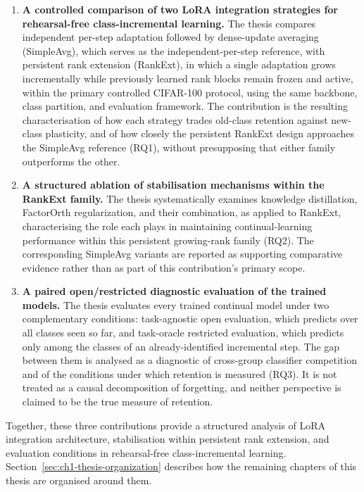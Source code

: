 \begin{enumerate}
\item \textbf{A controlled comparison of two LoRA integration strategies
   for rehearsal-free class-incremental learning.} The thesis compares
   independent per-step adaptation followed by dense-update averaging
   (SimpleAvg), which serves as the independent-per-step reference, with
   persistent rank extension (RankExt), in which a single adaptation grows
   incrementally while previously learned rank blocks remain frozen and
   active, within the primary controlled CIFAR-100 protocol, using the same backbone, class
   partition, and evaluation framework. The contribution is the resulting
   characterisation of how each strategy trades old-class retention against
   new-class plasticity, and of how closely the persistent RankExt design
   approaches the SimpleAvg reference (RQ1), without presupposing that
   either family outperforms the other.

\item \textbf{A structured ablation of stabilisation mechanisms within the
   RankExt family.} The thesis systematically examines knowledge
   distillation, FactorOrth regularization, and their combination, as
   applied to RankExt, characterising the role each plays in maintaining
   continual-learning performance within this persistent growing-rank
   family (RQ2). The corresponding SimpleAvg variants are reported as
   supporting comparative evidence rather than as part of this
   contribution's primary scope.

\item \textbf{A paired open/restricted diagnostic evaluation of the
   trained models.} The thesis evaluates every trained continual model
   under two complementary conditions: task-agnostic open evaluation, which
   predicts over all classes seen so far, and task-oracle restricted
   evaluation, which predicts only among the classes of an
   already-identified incremental step. The gap between them is analysed
   as a diagnostic of cross-group classifier competition and of the
   conditions under which retention is measured (RQ3). It is not treated as
   a causal decomposition of forgetting, and neither perspective is claimed
   to be the true measure of retention.
\end{enumerate}

Together, these three contributions provide a structured analysis of LoRA
integration architecture, stabilisation within persistent rank extension,
and evaluation conditions in rehearsal-free class-incremental learning.
Section~\ref{sec:ch1-thesis-organization} describes how the remaining
chapters of this thesis are organised around them.

